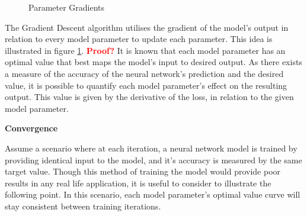 \begin{figure}
    \centering
    \qquad
    \caption{Parameter Gradients}%
    \label{fig:parameter_gradient}%
\end{figure}

The Gradient Descent algorithm utilises the gradient of the model's output in relation to every model parameter
to update each parameter. This idea is illustrated in figure \ref{fig:parameter_gradient}. 
\textcolor{red}{\textbf{Proof?}} It is known that each model parameter has an optimal value that best maps the model's input to desired output.
As there exists a measure of the accuracy of the neural network's prediction and the desired value, 
it is possible to quantify each model parameter's effect on the resulting output. 
This value is given by the derivative of the loss, in relation to the given model parameter.

\textbf{Convergence}

Assume a scenario where at each iteration, a neural network model is trained by providing identical input to the model, 
and it's accuracy is measured by the same target value. Though this method of training the model would provide poor results in any real life application,
it is useful to consider to illustrate the following point. In this scenario, each model parameter's optimal value curve will stay consistent between training iterations.

